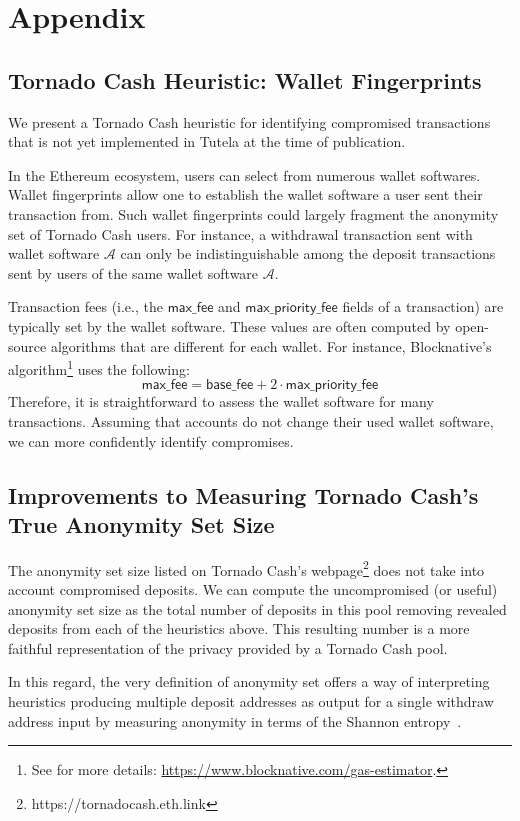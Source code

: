 \section{Appendix}

\subsection{Tornado Cash Heuristic: Wallet Fingerprints}
We present a Tornado Cash heuristic for identifying compromised transactions that is not yet implemented in Tutela at the time of publication.

In the Ethereum ecosystem, users can select from numerous wallet softwares. Wallet fingerprints allow one to establish the wallet software a user sent their transaction from. Such wallet fingerprints could largely fragment the anonymity set of Tornado Cash users. For instance, a withdrawal transaction sent with wallet software $\mathcal{A}$ can only be indistinguishable among the deposit transactions sent by users of the same wallet software $\mathcal{A}$. 

Transaction fees (i.e., the $\mathsf{max\_fee}$ and $\mathsf{max\_priority\_fee}$ fields of a transaction) are typically set by the wallet software. These values are often computed by open-source algorithms that are different for each wallet. For instance, Blocknative's algorithm\footnote{See for more details: \url{https://www.blocknative.com/gas-estimator}.} uses the following: \[\mathsf{max\_fee}=\mathsf{base\_fee}+2\cdot\mathsf{max\_priority\_fee}\] Therefore, it is straightforward to assess the wallet software for many transactions. Assuming that accounts do not change their used wallet software, we can more confidently identify compromises.

\subsection{Improvements to Measuring Tornado Cash's True Anonymity Set Size}

The anonymity set size listed on Tornado Cash's webpage\footnote{https://tornadocash.eth.link} does not take into account compromised deposits. We can compute the uncompromised (or useful) anonymity set size as the total number of deposits in this pool removing revealed deposits from each of the heuristics above. This resulting number is a more faithful representation of the privacy provided by a Tornado Cash pool.

In this regard, the very definition of anonymity set offers a way of interpreting heuristics producing multiple deposit addresses as output for a single withdraw address input by measuring anonymity in terms of the Shannon entropy~\cite{diaz2002towards}. 

